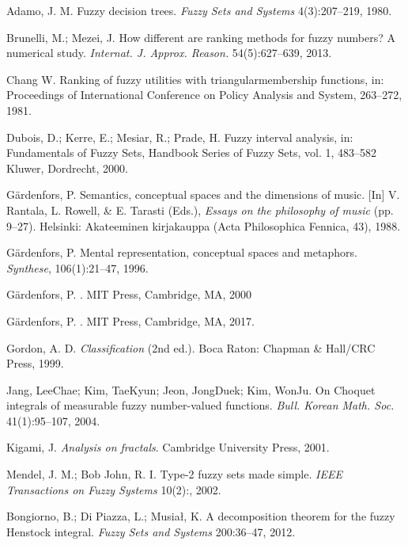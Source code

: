\documentclass[leqno,12pt]{amsart}
\theoremstyle{remark}
\theoremstyle{remark}
\theoremstyle{remark}
\theoremstyle{definition}
\numberwithin{equation}{section}
\begin{document}
\begin{thebibliography}{111}

Adamo, J. M. Fuzzy decision trees. {\em Fuzzy Sets and Systems} 4(3):207--219, 1980.

Brunelli, M.; Mezei, J. How different are ranking methods for fuzzy numbers? A numerical study. {\em Internat. J. Approx. Reason.} 54(5):627--639, 2013.

Chang W. Ranking of fuzzy utilities with triangularmembership functions, in: Proceedings of International Conference on Policy Analysis and System, 263--272, 1981.

Dubois, D.; Kerre, E.; Mesiar, R.; Prade, H. Fuzzy interval analysis, in: Fundamentals of Fuzzy Sets, Handbook Series of Fuzzy Sets, vol. 1, 483--582 Kluwer, Dordrecht, 2000.

G\"{a}rdenfors, P. Semantics, conceptual spaces and the dimensions of music. [In] V. Rantala, L. Rowell,
\& E. Tarasti (Eds.), {\em Essays on the philosophy of music} (pp. 9--27). Helsinki: Akateeminen kirjakauppa
(Acta Philosophica Fennica, 43), 1988.

G\"{a}rdenfors, P. Mental representation, conceptual spaces and metaphors. {\em Synthese}, 106(1):21--47, 1996.

G\"ardenfors, P.
. MIT Press, Cambridge, MA, 2000

G\"ardenfors, P.
. MIT Press, Cambridge, MA, 2017.

Gordon, A. D. {\em Classification} (2nd ed.). Boca Raton: Chapman \& Hall/CRC Press, 1999.

Jang, LeeChae; Kim, TaeKyun; Jeon, JongDuek; Kim, WonJu. On Choquet integrals of measurable fuzzy number-valued functions. {\em Bull. Korean Math. Soc.} 41(1):95--107, 2004.

Kigami, J. {\em Analysis on fractals}. Cambridge University Press, 2001.

Mendel, J. M.; Bob John, R. I.
Type-2 fuzzy sets made simple. {\em IEEE Transactions on Fuzzy Systems} 10(2):, 2002.

Bongiorno, B.; Di Piazza, L.; Musiał, K. A decomposition theorem for the fuzzy Henstock integral. {\em Fuzzy Sets and Systems} 200:36--47, 2012.


\end{thebibliography}
\end{document}
